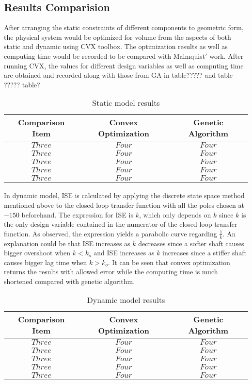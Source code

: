 \subsection*{Results Comparision}
After arranging the static constraints of different components to geometric form, the physical system would be optimized for volume from the aspects of both static and dynamic using CVX toolbox. The optimization results as well as computing time would be recorded to be compared with Malmquist$'$ work. 
After running CVX, the values for different design variables as well as computing time are obtained and recorded along with those from GA  in table????? and table ?????
table?                                     
\begin{table}[h]
\caption{Static model results}
\label{sta}
\begin{center}
\begin{tabular}{|c||c||c|}
\hline
Comparison Item & Convex Optimization & Genetic Algorithm\\
\hline
$Three$ & $Four$ & $Four$\\
\hline
$Three$ & $Four$ & $Four$\\
\hline
$Three$ & $Four$ & $Four$\\
\hline
$Three$ & $Four$ & $Four$\\
\hline
$Three$ & $Four$ & $Four$\\
\hline
\end{tabular}
\end{center}
\end{table}

In dynamic model, ISE is calculated by applying the discrete state space method mentioned above to the closed loop transfer function with all the poles chosen at $-150$ beforehand. The expression for ISE is $k$, which only depends on $k$ since $k$ is the only design variable contained in the numerator of the closed loop transfer function. As observed, the expression yields a parabolic curve regarding $\frac{1}{k}$. An explanation could be that ISE increases as $k$ decreases since a softer shaft causes bigger overshoot when $k<k_o$ and ISE increases as $k$ increases since a stiffer shaft causes bigger lag time when $k>k_o$.
It can be seen that convex optimization returns the results with allowed error while the computing time is much shortened compared with genetic algorithm. 
\begin{table}[h]
\caption{Dynamic model results}
\label{dyn}
\begin{center}
\begin{tabular}{|c||c||c|}
\hline
Comparison Item & Convex Optimization & Genetic Algorithm\\
\hline
$Three$ & $Four$ & $Four$\\
\hline
$Three$ & $Four$ & $Four$\\
\hline
$Three$ & $Four$ & $Four$\\
\hline
$Three$ & $Four$ & $Four$\\
\hline
$Three$ & $Four$ & $Four$\\
\hline
\end{tabular}
\end{center}
\end{table}
